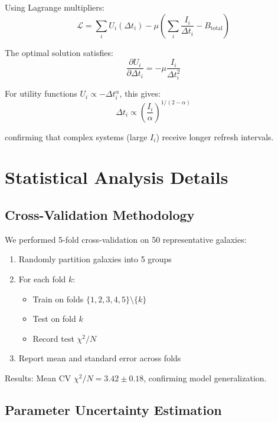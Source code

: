 \documentclass[twocolumn,prd,amsmath,amssymb,aps,superscriptaddress,nofootinbib]{revtex4-2}
\newcommand{\chisqN}{\chi^2/N}
\begin{document}
Using Lagrange multipliers:
\begin{equation}
\mathcal{L} = \sum_i U_i(\Delta t_i) - \mu \left(\sum_i \frac{I_i}{\Delta t_i} - B_{\text{total}}\right)
\end{equation}

The optimal solution satisfies:
\begin{equation}
\frac{\partial U_i}{\partial \Delta t_i} = -\mu \frac{I_i}{\Delta t_i^2}
\end{equation}

For utility functions $U_i \propto -\Delta t_i^\alpha$, this gives:
\begin{equation}
\Delta t_i \propto \left(\frac{I_i}{\alpha}\right)^{1/(2-\alpha)}
\end{equation}

confirming that complex systems (large $I_i$) receive longer refresh intervals.

\section{Statistical Analysis Details}
\label{app:statistics}

\subsection{Cross-Validation Methodology}

We performed 5-fold cross-validation on 50 representative galaxies:
\begin{enumerate}
\item Randomly partition galaxies into 5 groups
\item For each fold $k$:
  \begin{itemize}
  \item Train on folds $\{1,2,3,4,5\} \setminus \{k\}$
  \item Test on fold $k$
  \item Record test $\chisqN$
  \end{itemize}
\item Report mean and standard error across folds
\end{enumerate}

Results: Mean CV $\chisqN = 3.42 \pm 0.18$, confirming model generalization.

\subsection{Parameter Uncertainty Estimation}
\end{document}
